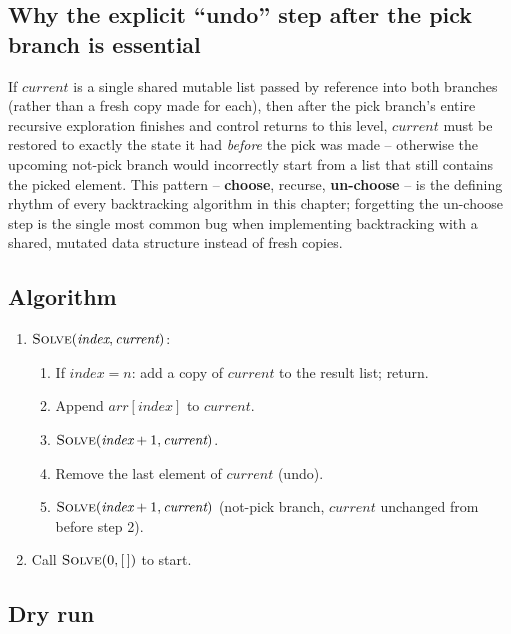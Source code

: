 \subsection*{Why the explicit ``undo'' step after the pick branch is essential}

If $\textit{current}$ is a single shared mutable list passed by
reference into both branches (rather than a fresh copy made for each),
then after the pick branch's entire recursive exploration finishes and
control returns to this level, $\textit{current}$ must be restored to
exactly the state it had \emph{before} the pick was made -- otherwise the
upcoming not-pick branch would incorrectly start from a list that still
contains the picked element. This pattern -- \textbf{choose}, recurse,
\textbf{un-choose} -- is the defining rhythm of every backtracking
algorithm in this chapter; forgetting the un-choose step is the single
most common bug when implementing backtracking with a shared, mutated
data structure instead of fresh copies.

\subsection*{Algorithm}

\begin{enumerate}
  \item $\textsc{Solve}(\textit{index}, \textit{current})$:
  \begin{enumerate}
    \item If $\textit{index} = n$: add a copy of $\textit{current}$ to
          the result list; return.
    \item Append $\textit{arr}[\textit{index}]$ to $\textit{current}$.
    \item $\textsc{Solve}(\textit{index}+1, \textit{current})$.
    \item Remove the last element of $\textit{current}$ (undo).
    \item $\textsc{Solve}(\textit{index}+1, \textit{current})$
          (not-pick branch, $\textit{current}$ unchanged from before
          step 2).
  \end{enumerate}
  \item Call $\textsc{Solve}(0, [\,])$ to start.
\end{enumerate}

\subsection*{Dry run}

